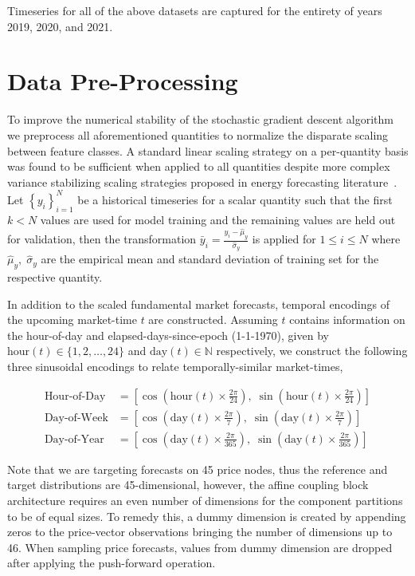 Timeseries for all of the above datasets are captured for the entirety of years 2019, 2020, and 2021.

\section{Data Pre-Processing}\label{sec:data-pre-processing}

To improve the numerical stability of the stochastic gradient descent algorithm we preprocess all
aforementioned quantities to normalize the disparate scaling between feature classes.
A standard linear scaling strategy on a per-quantity basis was found to be sufficient when applied to all quantities
despite more complex variance stabilizing scaling strategies proposed in energy forecasting literature~\cite{7997921}.
Let $\left\{ y_i \right\}_{i=1}^N$ be a historical timeseries for a scalar quantity such that the first $k < N$ values
are used for model training and the remaining values are held out for validation, then the transformation
$\bar{y}_i = \frac{y_i - \hat{\mu}_y}{\hat{\sigma}_y}$ is applied for $1 \leq i \leq N$ where
$\hat{\mu}_y,\;\hat{\sigma}_y$ are the empirical mean and standard deviation of training set for the respective quantity.

In addition to the scaled fundamental market forecasts, temporal encodings of the upcoming market-time $t$ are constructed.
Assuming $t$ contains information on the hour-of-day and elapsed-days-since-epoch (1-1-1970), given by
$\text{hour}(t) \in \{1, 2, \dots, 24\}$ and $\text{day}(t) \in \mathbb{N}$ respectively, we construct the following three
sinusoidal encodings to relate temporally-similar market-times,

\begin{align*}
    \text{Hour-of-Day} &= \left[ \cos\left( \text{hour}(t) \times \frac{2\pi}{24} \right), \; \sin\left( \text{hour}(t) \times \frac{2\pi}{24} \right)\right] \\
    \text{Day-of-Week} &= \left[ \cos\left( \text{day}(t) \times \frac{2\pi}{7} \right), \; \sin\left( \text{day}(t) \times \frac{2\pi}{7} \right)\right] \\
    \text{Day-of-Year} &= \left[ \cos\left( \text{day}(t) \times \frac{2\pi}{365} \right), \; \sin\left( \text{day}(t) \times \frac{2\pi}{365} \right)\right]
\end{align*}


Note that we are targeting forecasts on 45 price nodes, thus the reference and target
distributions are 45-dimensional, however, the affine coupling block architecture requires an even number of
dimensions for the component partitions to be of equal sizes.
To remedy this, a dummy dimension is created by appending zeros to the price-vector observations bringing the number of
dimensions up to 46.
When sampling price forecasts, values from dummy dimension are dropped after applying the push-forward operation.


